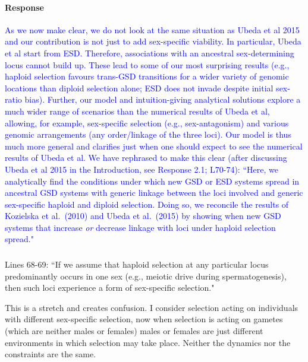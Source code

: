 \documentclass[10pt,letterpaper]{article}
\begin{document}
\noindent\paragraph{Response}
\textcolor{blue}{
As we now make clear, we do not look at the same situation as Ubeda et al 2015 and our contribution is not just to add sex-specific viability. 
In particular, Ubeda et al start from ESD. 
Therefore, associations with an ancestral sex-determining locus cannot build up. 
These lead to some of our most surprising results (e.g., haploid selection favours trans-GSD transitions for a wider variety of genomic locations than diploid selection alone; ESD does not invade despite initial sex-ratio bias).
Further, our model and intuition-giving analytical solutions explore a much wider range of scenarios than the numerical results of Ubeda et al, allowing, for example, sex-specific selection (e.g., sex-antagonism) and various genomic arrangements (any order/linkage of the three loci).
Our model is thus much more general and clarifies just when one should expect to see the numerical results of Ubeda et al.
We have rephrased to make this clear (after discussing Ubeda et al 2015 in the Introduction, see Response 2.1; L70-74): ``Here, we analytically find the conditions under which new GSD or ESD systems spread in ancestral GSD systems with generic linkage between the loci involved and generic sex-specific haploid and diploid selection. 
Doing so, we reconcile the results of Kozielska et al.\ (2010) and Ubeda et al.\ (2015) by showing when new GSD systems that increase \textit{or} decrease linkage with loci under haploid selection spread."
}

\noindent\subsubsection{}
Lines 68-69: ``If we assume that haploid selection at any particular locus predominantly occurs in one sex (e.g., meiotic drive during spermatogenesis), then such loci experience a form of sex-specific selection." 

This is a stretch and creates confusion. I consider selection acting on individuals with different sex-specific selection, now when selection is acting on gametes (which are neither males or females) males or females are just different environments in which selection may take place. Neither the dynamics nor the constraints are the same. 
\end{document}

